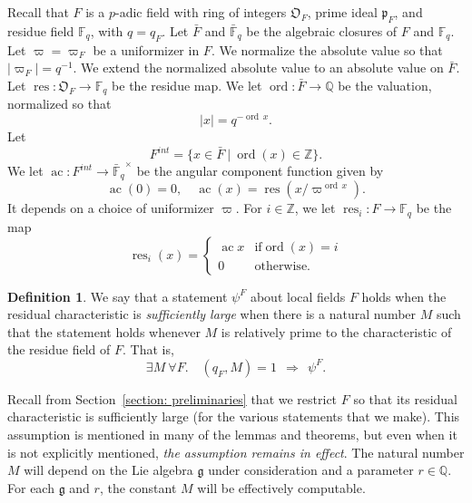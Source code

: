 \documentclass[11pt]{amsart}
\theoremstyle{definition}
\newtheorem{definition}[theorem]{Definition}
\theoremstyle{remark}
\numberwithin{equation}{theorem}
\def\F{{F}}
\def\A{{\mathfrak{O}_\F}}
\def\pFA{{\mathfrak{p}_\F}}
\def\f{{\mathbb{F}_q}}
\def\barf{{\bar{\mathbb{F}}_q}}
\def\tq{{\ \vert\ }}
\newcommand{\ring}[1]{\mathbb{#1}}
\def\op#1{\operatorname{#1}}
\def\lie#1{{\mathfrak{#1}}}
\def\ac{\operatorname{ac}}
\begin{document}
Recall that $F$ is a $p$-adic field with ring of integers $\A$,
prime ideal $\pFA$, and residue field $\f$, with $q=q_F$. Let
$\bar F$ and $\barf$ be the algebraic closures of $F$ and $\f$.
Let $\varpi = \varpi_F$ be a uniformizer in $F$.  We normalize the
absolute value so that $|\varpi_F|=q^{-1}$.  We extend the
normalized absolute value to an absolute value on $\bar F$. Let
$\op{res}:\A\to \f$ be the residue map.  We let $\op{ord}:\bar
F\to \ring{Q}$ be the valuation, normalized so that
   \begin{equation}
   |x| = q^{-\op{ord}\, x}.
   \end{equation}
Let
   \begin{equation}
   F^{int} = \{x \in \bar F \tq \op{ord}(x) \in \ring{Z}\}.
   \end{equation}
We let $\op{ac}:F^{int} \to \barf^\times$ be the angular component
function given by
   \begin{equation}
   \op{ac}(0) = 0,\quad \op{ac}(x) =
   \op{res}(x/\varpi^{\op{ord}\,x}).
   \end{equation}
It depends on a choice of uniformizer $\varpi$. For $i\in
\ring{Z}$, we let $\op{res}_i: F\to \f$ be the map
   \begin{equation}\op{res}_i(x) = \begin{cases} \ac{x} &
   \text{if}\op{ord}(x)=i\\
   0 & \text{otherwise}.
   \end{cases}
   \end{equation}

\begin{definition}
We say that a statement $\psi^F$ about local fields $F$ holds when
the residual characteristic is {\it sufficiently large\/} when
there is a natural number $M$ such that the statement holds
whenever $M$ is relatively prime to the characteristic of the
residue field of $F$. That is,
   \begin{equation}
   \exists M\ \forall F.\quad
   (q_F,M)=1 ~~\Rightarrow~~ \psi^F.
   \end{equation}
\end{definition}

Recall from Section~\ref{section: preliminaries} that we restrict
$F$ so that its residual characteristic is sufficiently large (for
the various statements that we make). This assumption is mentioned
in many of the lemmas and theorems, but even when it is not
explicitly mentioned, {\it the assumption remains in effect}.  The
natural number $M$ will depend on the Lie algebra $\lie{g}$ under
consideration and a parameter $r\in \ring{Q}$. For each $\lie{g}$
and $r$, the constant $M$ will be effectively computable.
\end{document}
